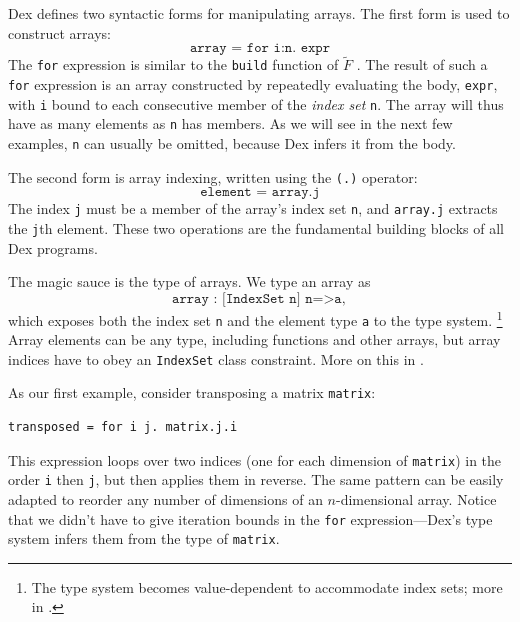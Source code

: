 \documentclass[acmsmall,screen,nonacm]{acmart}
\newlength{\codeindent}
\newcommand{\ttt}[1]{\texttt{#1}}
\newcommand{\codelinesize}{\normalsize}
\begin{document}
Dex defines two syntactic forms for manipulating arrays.
The first form is used to construct arrays:
$$\ttt{array = for i:n. expr}$$
The \texttt{for} expression is similar to the \texttt{build} function of $\tilde{F}$ \cite{shaikhha2019fsmooth}.
The result of such a \texttt{for} expression is an array constructed by repeatedly evaluating the body, \texttt{expr}, with \texttt{i} bound to each consecutive member of the \emph{index set} \texttt{n}.
The array will thus have as many elements as \texttt{n} has members.
As we will see in the next few examples, \ttt{n} can usually be omitted, because Dex infers it from the body.


The second form is array indexing, written using the \texttt{(.)} operator:
$$ \ttt{element = array.j} $$
The index \texttt{j} must be a member of the array's index set \texttt{n}, and \texttt{array.j} extracts the \texttt{j}th element.
These two operations are the fundamental building blocks of all Dex programs.

The magic sauce is the type of arrays.  We type an array as
$$\texttt{array : [IndexSet n] n=>a},$$
which exposes both the index set \ttt{n} and the element type \ttt{a} to the type system.%
\footnote{The type system becomes value-dependent to accommodate index sets; more in .}
Array elements can be any type, including functions and other arrays, but array indices have to obey an \ttt{IndexSet} class constraint.  More on this in .

As our first example, consider transposing a matrix \texttt{matrix}:
\begin{Verbatim}[xleftmargin=\codeindent,fontsize=\codelinesize]
transposed = for i j. matrix.j.i
\end{Verbatim}
This expression loops over two indices (one for each dimension of \texttt{matrix}) in the order \texttt{i} then \texttt{j}, but then applies them in reverse.
The same pattern can be easily adapted to reorder any number of dimensions of an $n$-dimensional array.
Notice that we didn't have to give iteration bounds in the \texttt{for} expression---Dex's type system infers them from the type of \texttt{matrix}.
\end{document}
